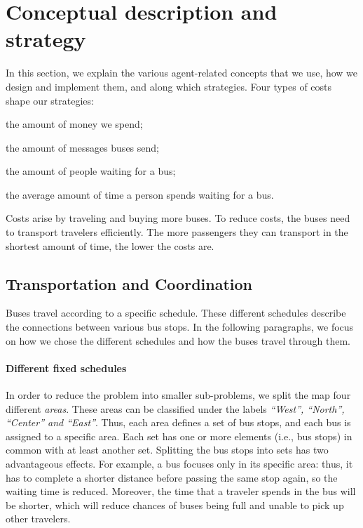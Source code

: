 \section{Conceptual description and strategy}
\label{sec:conceptual}

In this section, we explain the various agent-related concepts that we use, how we design and implement them, and along which strategies. Four types of costs shape our strategies:
\begin{enumerate*}[label=(\roman*)]
\item the amount of money we spend;
\item the amount of messages buses send;
\item the amount of people waiting for a bus;
\item the average amount of time a person spends waiting for a bus.
\end{enumerate*}

Costs arise by traveling and buying more buses. To reduce costs, the buses need to transport travelers efficiently. The more passengers they can transport in the shortest amount of time, the lower the costs are.

\subsection{Transportation and Coordination}

Buses travel according to a specific schedule. These different schedules describe the connections between various bus stops. In the following paragraphs, we focus on how we chose the different schedules and how the buses travel through them.
 
\paragraph{Different fixed schedules}

In order to reduce the problem into smaller sub-problems, we split the map four different \textit{areas}. These areas can be classified under the labels \textit{``West'', ``North'', ``Center'' and ``East''}. Thus, each area defines a set of bus stops, and each bus is assigned to a specific area. Each set has one or more elements (i.e., bus stops) in common with at least another set.
Splitting the bus stops into sets has two advantageous effects. For example, a bus focuses only in its specific area: thus, it has to complete a shorter distance before passing the same stop again, so the waiting time is reduced. Moreover, the time that a traveler spends in the bus will be shorter, which will reduce chances of buses being full and unable to pick up other travelers.

